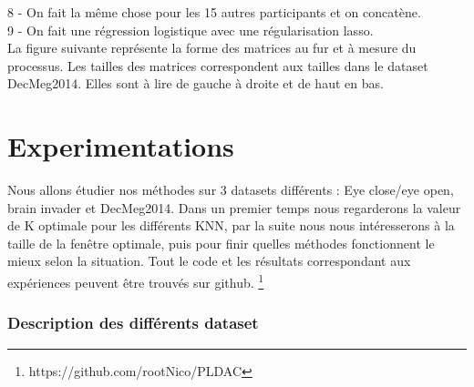 \documentclass{article}[12pt]
\begin{document}
8 - On fait la même chose pour les 15 autres participants et on concatène.\\
9 - On fait une régression logistique avec une régularisation lasso.\\
La figure suivante représente la forme des matrices au fur et à mesure du processus. Les tailles des matrices correspondent aux tailles dans le dataset DecMeg2014. Elles sont à lire de gauche à droite et de haut en bas.
\\


\part{Experimentations}
Nous allons étudier nos méthodes sur 3 datasets différents : Eye close/eye open, brain invader et DecMeg2014. Dans un premier temps nous regarderons la valeur de K optimale pour les différents KNN, par la suite nous nous intéresserons à la taille de la fenêtre optimale, puis pour finir quelles méthodes fonctionnent le mieux selon la situation. Tout le code et les résultats correspondant aux expériences peuvent être trouvés sur github. \footnote{https://github.com/rootNico/PLDAC}
\section{Description des différents dataset}
\end{document}
